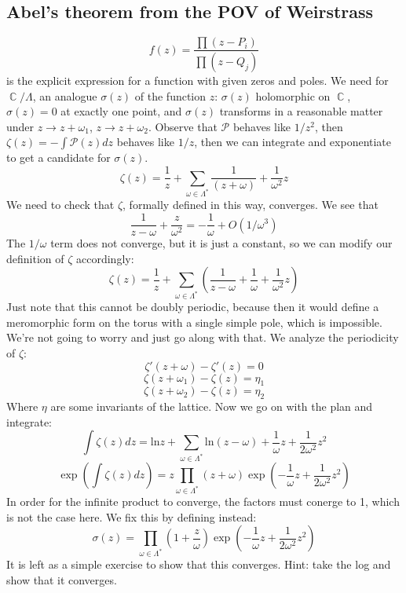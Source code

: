 \documentclass[12 pt]{article}
\DeclareMathOperator {\C} {\mathbb{C}}
\theoremstyle{plain}
\theoremstyle{definition}
\theoremstyle{remark}
\begin{document}
\subsection*{Abel's theorem from the POV of Weirstrass}
\[    f(z) = \frac{\prod (z- P_i)}{\prod (z - Q_j)}    \]
is the explicit expression for a function with given zeros and poles. We need for $\C/\Lambda$, an analogue $\sigma(z)$ of the function $z$: $\sigma(z)$ holomorphic on $\C$, $\sigma(z) = 0$ at exactly one point, and $\sigma(z)$ transforms in a reasonable matter under $z \to z + \omega_1$, $z \to z + \omega_2$. Observe that $\mathcal{P}$ behaves like $1/z^2$, then $\zeta(z) = - \int \mathcal{P} (z) dz$ behaves like $1/z$, then we can integrate and exponentiate to get a candidate for $\sigma(z)$.
\[       \zeta(z) = \frac{1}{z} + \sum_{\omega \in \Lambda^*} \frac{1}{(z + \omega)} + \frac{1}{\omega^2} z    \]
We need to check that $\zeta$, formally defined in this way, converges. We see that
\[     \frac{1}{z-\omega} + \frac{z}{\omega^2} = - \frac{1}{\omega} + O(1/\omega^3)      \]
The $1/\omega$ term does not converge, but it is just a constant, so we can modify our definition of $\zeta$ accordingly:
\[        \zeta(z) = \frac{1}{z} + \sum_{\omega \in \Lambda^*} \left( \frac{1}{z-\omega} + \frac{1}{\omega} + \frac{1}{\omega^2} z  \right)       \]
Just note that this cannot be doubly periodic, because then it would define a meromorphic form on the torus with a single simple pole, which is impossible. We're not going to worry and just go along with that. We analyze the periodicity of $\zeta$:
\[      \zeta' (z+ \omega) - \zeta'(z) = 0     \]
\[      \zeta (z+ \omega_1) - \zeta(z) = \eta_1     \]
\[      \zeta (z+ \omega_2) - \zeta(z) = \eta_2     \]
Where $\eta$ are some invariants of the lattice. Now we go on with the plan and integrate:
\[      \int \zeta(z) dz = \text{ln} z + \sum_{\omega \in \Lambda^*} \text{ln} (z-\omega) + \frac{1}{\omega} z + \frac{1}{2\omega^2} z^2     \]
\[     \exp \left(    \int \zeta(z) dz \right) = z \prod_{\omega \in \Lambda^*} (z+\omega) \exp \left(- \frac{1}{\omega}z + \frac{1}{2\omega^2} z^2  \right)       \]
In order for the infinite product to converge, the factors must conerge to 1, which is not the case here. We fix this by defining instead:
\[     \sigma(z) = \prod_{\omega \in \Lambda^*} \left(1 + \frac{z}{\omega} \right)  \exp \left( - \frac{1}{\omega} z + \frac{1}{2\omega^2} z^2  \right)     \]
It is left as a simple exercise to show that this converges. Hint: take the log and show that it converges.
\end{document}
